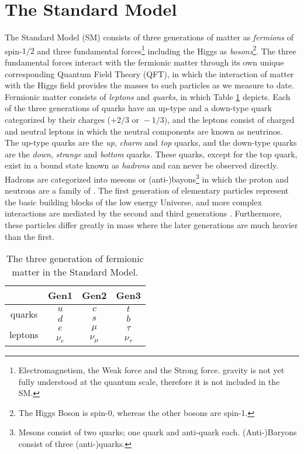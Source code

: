 
\section{The Standard Model}
The Standard Model (SM) consists of three generations of matter as \textit{fermions} of spin-$1/2$ and three fundamental forces\footnote{Electromagnetism, the Weak force and the Strong force. gravity is not yet fully understood at the quantum scale, therefore it is not included in the SM.} including the Higgs as \textit{bosons}\footnote{The Higgs Boson is spin-0, whereas the other bosons are spin-1.}. The three fundamental forces interact with the fermionic matter through its own unique corresponding Quantum Field Theory (QFT), in which the interaction of matter with the Higgs field provides the masses to such particles as we measure to date. \\

Fermionic matter consists of \textit{leptons} and \textit{quarks}, in which Table \ref{tab:SMFerm} depicts. Each of the three generations of quarks have an up-type and a down-type quark categorized by their charges ($+2/3 \text{ or } -1/3$), and the leptons consist of charged and neutral leptons in which the neutral components are known as neutrinos. The up-type quarks are the \textit{up}, \textit{charm} and \textit{top} quarks, and the down-type quarks are the \textit{down}, \textit{strange} and \textit{bottom} quarks. These quarks, except for the top quark, exist in a bound state known as \textit{hadrons} and can never be observed directly. Hadrons are categorized into mesons or (anti-)bayons\footnote{Mesons consist of two quarks; one quark and anti-quark each. (Anti-)Baryons consist of three (anti-)quarks.} in which the proton and neutrons are a family of \cite{thomson2013modern}. The first generation of elementary particles represent the basic building blocks of the low energy Universe, and more complex interactions are mediated by the second and third generations \cite{thomson2013modern}. Furthermore, these particles differ greatly in mass where the later generations are much heavier than the first. \\

\begin{table}[htbp]
    \centering
    \begin{tabular}{||c|c|c|c||}
    \hline
    & Gen1 & Gen2 & Gen3 \\
    \hline
    \multirow{2}{1.2cm}{quarks} & $u$ & $c$ & $t$ \\
     & $d$ & $s$ & $b$ \\
    \hline
    \multirow{2}{1.2cm}{leptons} & $e$ & $\mu$ & $\tau$ \\
     & $\nu_e$ & $\nu_\mu$ & $\nu_\tau$ \\
    \hline
    \end{tabular}
    \caption{The three generation of fermionic matter in the Standard Model.}
    \label{tab:SMFerm}
\end{table}


